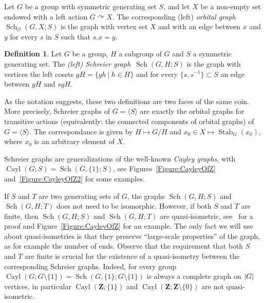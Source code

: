 \documentclass[a4paper]{article}
\theoremstyle{definition}
\newtheorem{defn}[lem]{Definition}
\theoremstyle{remark}
\DeclareMathOperator\Cayley{Cayl}
\DeclareMathOperator\Sch{Sch}
\DeclareMathOperator\stab{Stab}
\DeclarePairedDelimiter\abs{\lvert}{\rvert}
\newcommand*{\field}[1]{\mathbf{#1}}
\newcommand*{\Z}{\field{Z}}
\newcommand{\setst}[2]{\{#1\ |\ #2\}}
\begin{document}
Let $G$ be a group with symmetric generating set $S$, and let $X$ be a non-empty set endowed with a left action $G\curvearrowright X$.
The corresponding (left) \emph{orbital graph} $\Sch_{\mathcal O}(G,X;S)$ is the graph with vertex set $X$ and with an edge between $x$ and $y$ for every $s$ in $S$ such that $s.x=y$.
%
%
\begin{defn}
Let $G$ be a group, $H$ a subgroup of $G$ and $S$ a symmetric generating set. The \emph{(left) Schreier graph} $\Sch(G,H;S)$ is the graph with vertices the left cosets $gH=\setst{gh}{h\in H}$ and for every $\{s,s^{-1}\}\subset S$ an edge between $gH$ and $sgH$.%
\end{defn}
%
%
As the notation suggests, these two definitions are two faces of the same coin. More precisely, Schreier graphs of $G=\langle S\rangle$ are exactly the orbital graphs for transitive actions (equivalently: the connected components of orbital graphs) of $G=\langle S\rangle$.
The correspondance is given by $H\mapsto G/H$ and $x_0\in X\mapsto\stab_G(x_0)$, where $x_0$ is an arbitrary element of $X$.

Schreier graphs are generalizations of the well-known \emph{Cayley graphs}, with $\Cayley(G;S)=\Sch(G,\{1\};S)$, see Figures~\ref{Figure:CayleyOfZ} and~\ref{Figure:CayleyOfZ2} for some examples.


If $S$ and $T$ are two generating sets of $G$, the graphs $\Sch(G,H;S)$ and $\Sch(G,H;T)$ does not need to be isomorphic. However, if both $S$ and $T$ are finite, then $\Sch(G,H;S)$ and $\Sch(G,H;T)$ are quasi-isometric, see~\cite[IV.B.21.iii]{DelaHarpe2000} for a proof and Figure~\ref{Figure:CayleyOfZ} for an example. The only fact we will use about quasi-isometries is that they preserve ``large-scale properties'' of the graph, as for example the number of ends.
Observe that the requirement that both $S$ and $T$ are finite is crucial for the existence of a quasi-isometry between the corresponding Schreier graphs. Indeed, for every group  $\Cayley(G;G\setminus\{1\})=\Sch(G,\{1\};G\setminus\{1\})$ is always a complete graph on $\abs{G}$ vertices, in particular  $\Cayley(\Z;\{1\})$ and $\Cayley(\Z;\Z\setminus\{0\})$ are not quasi-isometric.
\end{document}
